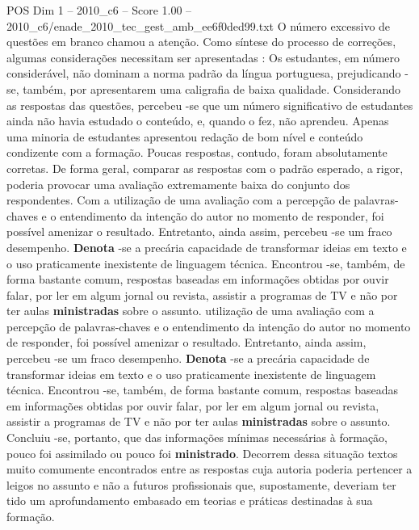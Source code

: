 \begin{textsample}{POS Dim 1 – 2010\_c6 – Score 1.00 – 2010\_c6/enade\_2010\_tec\_gest\_amb\_ee6f0ded99.txt}
O número excessivo de questões em branco chamou a atenção.
Como síntese do processo de correções, algumas considerações necessitam ser apresentadas : Os estudantes, em número considerável, não dominam a norma padrão da língua portuguesa, prejudicando -se, também, por apresentarem uma caligrafia de baixa qualidade.
Considerando as respostas das questões, percebeu -se que um número significativo de estudantes ainda não havia estudado o conteúdo, e, quando o fez, não aprendeu.
Apenas uma minoria de estudantes apresentou redação de bom nível e conteúdo condizente com a formação.
Poucas respostas, contudo, foram absolutamente corretas.
De forma geral, comparar as respostas com o padrão esperado, a rigor, poderia provocar uma avaliação extremamente baixa do conjunto dos respondentes.
Com a utilização de uma avaliação com a percepção de palavras-chaves e o entendimento da intenção do autor no momento de responder, foi possível amenizar o resultado.
Entretanto, ainda assim, percebeu -se um fraco desempenho. \textbf{Denota} -se a precária capacidade de transformar ideias em texto e o uso praticamente inexistente de linguagem técnica.
Encontrou -se, também, de forma bastante comum, respostas baseadas em informações obtidas por ouvir falar, por ler em algum jornal ou revista, assistir a programas de TV e não por ter aulas \textbf{ministradas} sobre o assunto. utilização de uma avaliação com a percepção de palavras-chaves e o entendimento da intenção do autor no momento de responder, foi possível amenizar o resultado.
Entretanto, ainda assim, percebeu -se um fraco desempenho. \textbf{Denota} -se a precária capacidade de transformar ideias em texto e o uso praticamente inexistente de linguagem técnica.
Encontrou -se, também, de forma bastante comum, respostas baseadas em informações obtidas por ouvir falar, por ler em algum jornal ou revista, assistir a programas de TV e não por ter aulas \textbf{ministradas} sobre o assunto.
Concluiu -se, portanto, que das informações mínimas necessárias à formação, pouco foi assimilado ou pouco foi \textbf{ministrado}.
Decorrem dessa situação textos muito comumente encontrados entre as respostas cuja autoria poderia pertencer a leigos no assunto e não a futuros profissionais que, supostamente, deveriam ter tido um aprofundamento embasado em teorias e práticas destinadas à sua formação.

\end{textsample}
